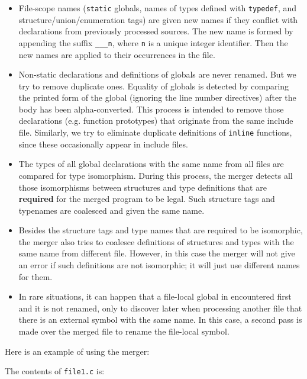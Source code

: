 \documentclass[letterpaper]{article}
\def\t#1{{\tt #1}}
\begin{document}
\begin{itemize}
\item File-scope names (\t{static} globals, names of types defined with
\t{typedef}, and structure/union/enumeration tags) are given new names if they
conflict with declarations from previously processed sources. The new name is
formed by appending the suffix \t{\_\_\_n}, where \t{n} is a unique integer
identifier. Then the new names are applied to their occurrences in the file. 

\item Non-static declarations and definitions of globals are never renamed.
But we try to remove duplicate ones. Equality of globals is detected by
comparing the printed form of the global (ignoring the line number directives)
after the body has been alpha-converted. This process is intended to remove
those declarations (e.g. function prototypes) that originate from the same
include file. Similarly, we try to eliminate duplicate definitions of
\t{inline} functions, since these occasionally appear in include files.

\item The types of all global declarations with the same name from all files
are compared for type isomorphism. During this process, the merger detects all
those isomorphisms between structures and type definitions that are {\bf
required} for the merged program to be legal. Such structure tags and
typenames are coalesced and given the same name. 

\item Besides the structure tags and type names that are required to be
isomorphic, the merger also tries to coalesce definitions of structures and
types with the same name from different file. However, in this case the merger
will not give an error if such definitions are not isomorphic; it will just
use different names for them. 

\item In rare situations, it can happen that a file-local global in
encountered first and it is not renamed, only to discover later when
processing another file that there is an external symbol with the same name.
In this case, a second pass is made over the merged file to rename the
file-local symbol. 
\end{itemize}

 Here is an example of using the merger:

 The contents of \t{file1.c} is:
\end{document}
